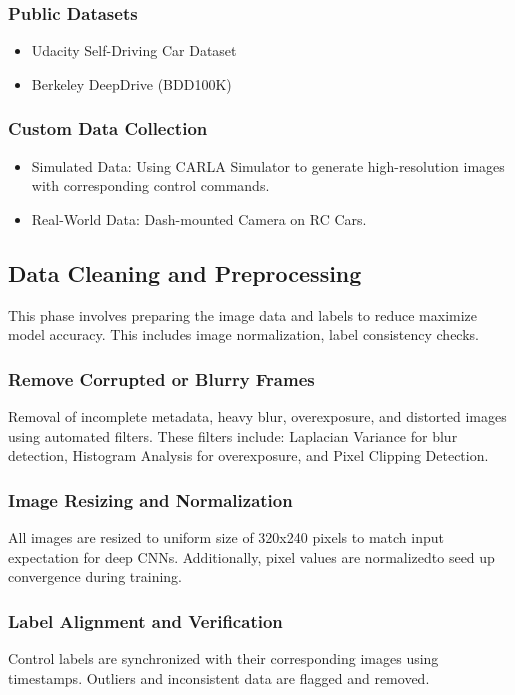 \documentclass{article} %
\begin{document}
\subsubsection{Public Datasets}
\begin{itemize}
  \item Udacity Self-Driving Car Dataset
  \item Berkeley DeepDrive (BDD100K)
\end{itemize}

\subsubsection{Custom Data Collection}
\begin{itemize}
  \item Simulated Data: Using CARLA Simulator to generate high-resolution images with corresponding control commands.
  \item Real-World Data: Dash-mounted Camera on RC Cars.
\end{itemize}


\subsection{Data Cleaning and Preprocessing}

This phase involves preparing the image data and labels to reduce maximize model accuracy. 
This includes image normalization, label consistency checks.

\subsubsection{Remove Corrupted or Blurry Frames}
Removal of incomplete metadata, heavy blur, overexposure, and distorted images using automated filters.
These filters include: Laplacian Variance for blur detection, Histogram Analysis for overexposure, 
and Pixel Clipping Detection.


\subsubsection{Image Resizing and Normalization}
All images are resized to uniform size of 320x240 pixels to match input expectation for deep CNNs. Additionally, 
pixel values are normalizedto seed up convergence during training.

\subsubsection{Label Alignment and Verification}
Control labels are synchronized with their corresponding images using timestamps. Outliers and inconsistent 
data are flagged and removed. 
\end{document}
